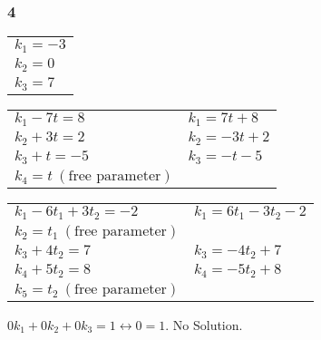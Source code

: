 \documentclass{article}
\begin{document}
\subsubsection*{4}
\begin{enumerate}
    \begin{tabular}{l}
        $k_1 = -3$ \\
        $k_2 = 0$  \\
        $k_3 = 7$
    \end{tabular}
    \begin{tabular}{ll}
        $k_1 - 7t = 8$ & $k_1 = 7t + 8$   \\
        $k_2 + 3t = 2$ & $k_2 = -3t + 2$  \\
        $k_3 + t = -5$ & $k_3 = -t -5$    \\
        $k_4 = t~(\text{free parameter})$ \\
    \end{tabular}
    \begin{tabular}{ll}
        $k_1 - 6t_1 + 3t_2 = -2$ & $k_1 = 6t_1 - 3t_2 - 2$ \\
        $k_2 = t_1~(\text{free parameter})$                \\
        $k_3 + 4t_2 = 7$         & $k_3 = -4t_2 + 7$       \\
        $k_4 + 5t_2 = 8$         & $k_4 = -5t_2 + 8$       \\
        $k_5 = t_2~(\text{free parameter})$                \\
    \end{tabular}
    $0k_1 + 0k_2 + 0k_3 = 1 \leftrightarrow 0 = 1$. No Solution.
\end{enumerate}
\end{document}
